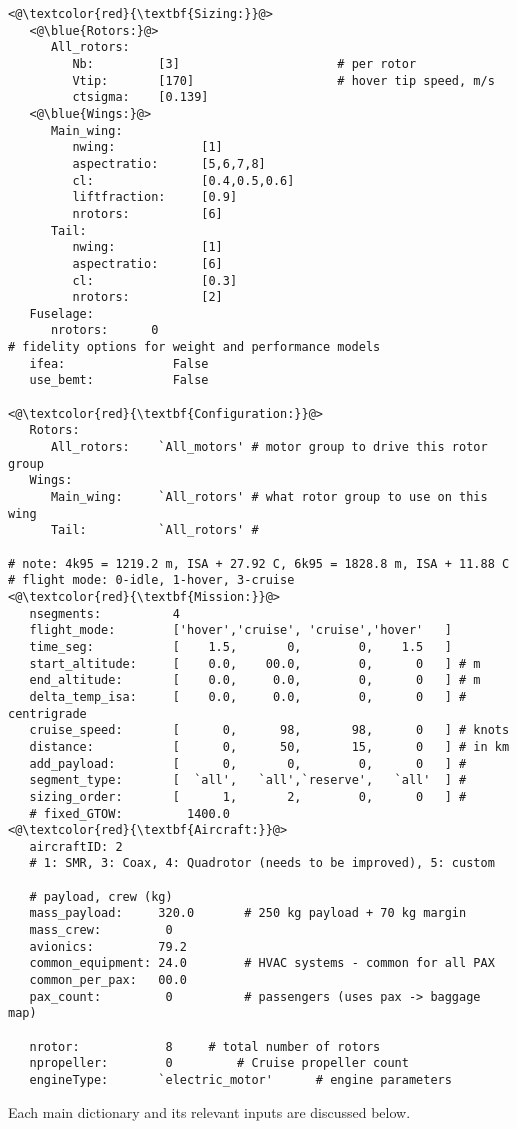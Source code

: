 \begin{lstlisting}
<@\textcolor{red}{\textbf{Sizing:}}@>
   <@\blue{Rotors:}@>
      All_rotors:
         Nb:         [3]                      # per rotor
         Vtip:       [170]                    # hover tip speed, m/s
         ctsigma:    [0.139]
   <@\blue{Wings:}@>
      Main_wing:
         nwing:            [1]
         aspectratio:      [5,6,7,8] 
         cl:               [0.4,0.5,0.6]
         liftfraction:     [0.9]
         nrotors:          [6]
      Tail:
         nwing:            [1]
         aspectratio:      [6]
         cl:               [0.3]
         nrotors:          [2]
   Fuselage:
      nrotors:      0
# fidelity options for weight and performance models
   ifea:               False    
   use_bemt:           False

<@\textcolor{red}{\textbf{Configuration:}}@>
   Rotors:
      All_rotors:    `All_motors' # motor group to drive this rotor group
   Wings:
      Main_wing:     `All_rotors' # what rotor group to use on this wing
      Tail:          `All_rotors' # 

# note: 4k95 = 1219.2 m, ISA + 27.92 C, 6k95 = 1828.8 m, ISA + 11.88 C
# flight mode: 0-idle, 1-hover, 3-cruise
<@\textcolor{red}{\textbf{Mission:}}@>
   nsegments:          4
   flight_mode:        ['hover','cruise', 'cruise','hover'   ]
   time_seg:           [    1.5,       0,        0,    1.5   ]
   start_altitude:     [    0.0,    00.0,        0,      0   ] # m
   end_altitude:       [    0.0,     0.0,        0,      0   ] # m
   delta_temp_isa:     [    0.0,     0.0,        0,      0   ] # centrigrade
   cruise_speed:       [      0,      98,       98,      0   ] # knots
   distance:           [      0,      50,       15,      0   ] # in km
   add_payload:        [      0,       0,        0,      0   ] # 
   segment_type:       [  `all',   `all',`reserve',   `all'  ] # 
   sizing_order:       [      1,       2,        0,      0   ] # 
   # fixed_GTOW:         1400.0
<@\textcolor{red}{\textbf{Aircraft:}}@>
   aircraftID: 2
   # 1: SMR, 3: Coax, 4: Quadrotor (needs to be improved), 5: custom

   # payload, crew (kg)
   mass_payload:     320.0       # 250 kg payload + 70 kg margin
   mass_crew:         0 
   avionics:         79.2
   common_equipment: 24.0        # HVAC systems - common for all PAX
   common_per_pax:   00.0
   pax_count:         0          # passengers (uses pax -> baggage map)

   nrotor:            8 	# total number of rotors
   npropeller:        0         # Cruise propeller count
   engineType:       `electric_motor' 	   # engine parameters
\end{lstlisting}
\noindent Each main dictionary and its relevant inputs are discussed below.
